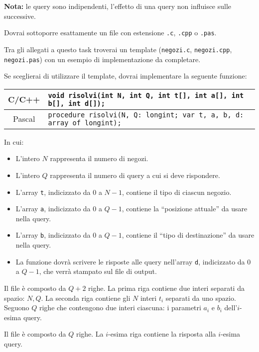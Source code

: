 \textbf{Nota:} le query sono indipendenti, l'effetto di una query non influisce sulle successive.

\Implementation
Dovrai sottoporre esattamente un file con estensione \texttt{.c}, \texttt{.cpp} o \texttt{.pas}.

\begin{warning}
Tra gli allegati a questo task troverai un template (\texttt{negozi.c}, \texttt{negozi.cpp}, \texttt{negozi.pas}) con un esempio di implementazione da completare.
\end{warning}

Se sceglierai di utilizzare il template, dovrai implementare la seguente funzione:
\begin{center}\begin{tabularx}{\textwidth}{|c|X|}
\hline
C/C++  & \verb|void risolvi(int N, int Q, int t[], int a[], int b[], int d[]);|\\
\hline
Pascal & \verb|procedure risolvi(N, Q: longint; var t, a, b, d: array of longint);|\\
\hline
\end{tabularx}\end{center}
In cui:
\begin{itemize}[nolistsep]
  \item L'intero $N$ rappresenta il numero di negozi.
  \item L'intero $Q$ rappresenta il numero di query a cui si deve rispondere.
  \item L'array \texttt{t}, indicizzato da $0$ a $N-1$, contiene il tipo di ciascun negozio.
  \item L'array \texttt{a}, indicizzato da $0$ a $Q-1$, contiene la ``posizione attuale'' da usare nella query.
  \item L'array \texttt{b}, indicizzato da $0$ a $Q-1$, contiene il ``tipo di destinazione'' da usare nella query.
  \item La funzione dovrà scrivere le risposte alle query nell'array \texttt{d}, indicizzato da $0$ a $Q-1$, che verrà stampato sul file di output.
\end{itemize}

\InputFile
Il file  è composto da $Q+2$ righe. La prima riga contiene due interi separati da spazio: $N, Q$. La seconda riga contiene gli $N$ interi $t_i$ separati da uno spazio. Seguono $Q$ righe che contengono due interi ciascuna: i parametri $a_i$ e $b_i$ dell'$i$-esima query.

\OutputFile
Il file \outputfile{} è composto da $Q$ righe. La $i$-esima riga contiene la risposta alla $i$-esima query.

